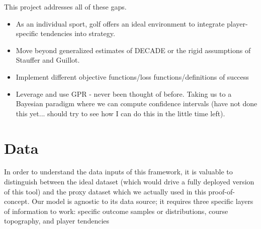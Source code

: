 \documentclass[11pt, letterpaper]{article}
\begin{document}
This project addresses all of these gaps.
\begin{itemize}
    \item As an individual sport, golf offers an ideal environment to integrate player-specific tendencies into strategy.
    \item Move beyond generalized estimates of DECADE or the rigid assumptions of Stauffer and Guillot.
    \item Implement different objective functions/loss functions/definitions of success
    \item Leverage and use GPR - never been thought of before. Taking us to a Bayesian paradigm where we can compute confidence intervals (have not done this yet... should try to see how I can do this in the little time left).
    
\end{itemize}

\section{Data}
In order to understand the data inputs of this framework, it is valuable to distinguish between the ideal dataset (which would drive a fully deployed version of this tool) and the proxy dataset which we actually used in this proof-of-concept. Our model is agnostic to its data source; it requires three specific layers of information to work: specific outcome samples or distributions, course topography, and player tendencies
\end{document}
